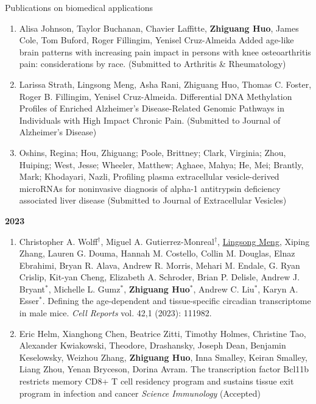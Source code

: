 \documentclass{resume} %
\begin{document}
\begin{rSection}{Publications on biomedical applications}
\begin{enumerate}[noitemsep,topsep=0pt]
\item
Alisa Johnson, Taylor Buchanan, Chavier Laffitte, {\bf Zhiguang Huo}, James Cole, Tom Buford, Roger Fillingim, Yenisel Cruz-Almeida
Added age-like brain patterns with increasing pain impact in persons with knee osteoarthritis pain: considerations by race. 
(Submitted to Arthritis \& Rheumatology)


\item
Larissa Strath, Lingsong Meng, Asha Rani, Zhiguang Huo, Thomas C. Foster, Roger B. Fillingim, Yenisel Cruz-Almeida.
Differential DNA Methylation Profiles of Enriched Alzheimer’s Disease-Related Genomic Pathways in Individuals with High Impact Chronic Pain.
(Submitted to Journal of Alzheimer’s Disease)


\item
Oshins, Regina; Hou, Zhiguang; Poole, Brittney; Clark, Virginia; Zhou, Huiping; West, Jesse; Wheeler, Matthew; Aghaee, Mahya; He, Mei; Brantly, Mark; Khodayari, Nazli,  
Profiling plasma extracellular vesicle-derived microRNAs for noninvasive diagnosis of alpha-1 antitrypsin deficiency associated liver disease
(Submitted to  Journal of Extracellular Vesicles)




\end{enumerate}

\textbf{2023}
\begin{enumerate}[noitemsep,topsep=0pt, resume]

\item 
Christopher A. Wolff$^\dagger$, Miguel A. Gutierrez-Monreal$^\dagger$, \underline{Lingsong Meng}, Xiping Zhang, Lauren G. Douma, Hannah M. Costello, Collin M. Douglas, Elnaz Ebrahimi, Bryan R. Alava, Andrew R. Morris, Mehari M. Endale, G. Ryan Crislip, Kit-yan Cheng, Elizabeth A. Schroder, Brian P. Delisle, Andrew J. Bryant$^*$, Michelle L. Gumz$^*$, {\bf Zhiguang Huo}$^*$, Andrew C. Liu$^*$, Karyn A. Esser$^*$.
Defining the age-dependent and tissue-specific circadian transcriptome in male mice.
\emph{Cell Reports} vol. 42,1 (2023): 111982. 

\item
Eric Helm, Xianghong Chen, Beatrice Zitti, Timothy Holmes, Christine Tao, Alexander Kwiakowski, Theodore, Drashansky, Joseph Dean, Benjamin Keselowsky, Weizhou Zhang,  {\bf Zhiguang Huo}, Inna Smalley, Keiran Smalley, Liang Zhou, Yenan Bryceson, Dorina Avram.
The transcription factor Bcl11b restricts memory CD8+ T cell residency program and sustains tissue exit program in infection and cancer
\emph{Science Immunology} (Accepted)


\end{enumerate}
\end{rSection}
\end{document}
